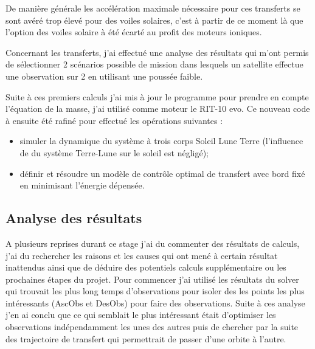 \documentclass[12pt]{article} %
\begin{document}
		De manière générale les accélération maximale nécessaire pour ces transferts se sont avéré trop élevé pour des voiles solaires, c'est à partir de ce moment là que l'option des voiles solaire à été écarté au profit des moteurs ioniques.	
		
		Concernant les transferts, j'ai effectué une analyse des résultats qui m'ont permis de sélectionner 2 scénarios possible de mission dans lesquels un satellite effectue une observation sur 2 en utilisant une poussée faible.
		
		Suite à ces premiers calculs j'ai mis à jour le programme pour prendre en compte l'équation de la masse, j'ai utilisé comme moteur le RIT-10 evo. Ce nouveau code à ensuite été rafiné pour effectué les opérations suivantes : 
		
		\begin{itemize}
			\item simuler la dynamique du système à trois corps Soleil Lune Terre (l'influence de du système Terre-Lune sur le soleil est négligé);
			\item définir et résoudre un modèle de contrôle optimal de transfert avec bord fixé en minimisant l'énergie dépensée.
		\end{itemize}
		
		\subsection{Analyse des résultats}
		
		A plusieurs reprises durant ce stage j'ai du commenter des résultats de calculs, j'ai du rechercher les raisons et les causes qui ont mené à certain résultat inattendus ainsi que de déduire des potentiels calculs supplémentaire ou les prochaines étapes du projet. Pour commencer j'ai utilisé les résultats du solver qui trouvait les plus long temps d'observations pour isoler des les points les plus intéressants  (\gls{AscObs} et \gls{DesObs}) pour faire des observations. Suite à ces analyse j'en ai conclu que ce qui semblait le plus intéressant était d'optimiser les observations indépendamment les unes des autres puis de chercher par la suite des trajectoire de transfert qui permettrait de passer d'une orbite à l'autre.
		
\end{document}
